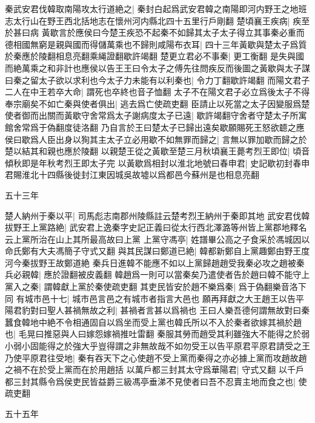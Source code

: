 秦武安君伐韓取南陽攻太行道絶之|{
	秦封白起爲武安君韓之南陽即河内野王之地班志太行山在野王西北括地志在懷州河内縣北四十五里行戶剛翻}
楚頃襄王疾病|{
	疾至於甚曰病}
黃歇言於應侯曰今楚王疾恐不起秦不如歸其太子太子得立其事秦必重而德相國無窮是親與國而得儲萬乘也不歸則咸陽布衣耳|{
	四十三年黃歇與楚太子爲質於秦應於陵翻相息亮翻乘䋲證翻歇許竭翻}
楚更立君必不事秦|{
	更工衡翻}
是失與國而絶萬乘之和非計也應侯以告王王曰令太子之傅先往問疾反而後圖之黃歇與太子謀曰秦之留太子欲以求利也今太子力未能有以利秦也|{
	令力丁翻歇許竭翻}
而陽文君子二人在中王若卒大命|{
	謂死也卒終也音子恤翻}
太子不在陽文君子必立爲後太子不得奉宗廟矣不如亡秦與使者俱出|{
	逃去爲亡使疏吏翻}
臣請止以死當之太子因變服爲楚使者御而出關而黃歇守舍常爲太子謝病度太子已遠|{
	歇許竭翻守舍者守楚太子所寓館舍常爲于偽翻度徒洛翻}
乃自言於王曰楚太子已歸出遠矣歇願賜死王怒欲聼之應侯曰歇爲人臣出身以狥其主太子立必用歇不如無罪而歸之|{
	言無以罪加歇而歸之於楚以結其和親也應於陵翻}
以親楚王從之黃歇至楚三月秋頃襄王薨考烈王即位|{
	頃音傾秋即是年秋考烈王即太子完}
以黃歇爲相封以淮北地號曰春申君|{
	史記歇初封春申君賜淮北十四縣後徙封江東因城吳故墟以爲都邑今蘇州是也相息亮翻}


五十三年

楚人納州于秦以平|{
	司馬彪志南郡州陵縣註云楚考烈王納州于秦即其地}
武安君伐韓拔野王上黨路絶|{
	武安君上逸秦字史記正義曰從太行西北澤潞等州皆上黨郡地釋名云上黨所治在山上其所最高故曰上黨}
上黨守馮亭|{
	姓譜畢公高之子食采於馮城因以命氏鄭有大夫馮簡子守式又翻}
與其民謀曰鄭道已絶|{
	韓都新鄭自上黨趣鄭由野王度河今秦拔野王故鄭道絶}
秦兵日進韓不能應不如以上黨歸趙趙受我秦必攻之趙被秦兵必親韓|{
	應於證翻被皮義翻}
韓趙爲一則可以當秦矣乃遣使者告於趙曰韓不能守上黨入之秦|{
	謂韓獻上黨於秦使疏吏翻}
其吏民皆安於趙不樂爲秦|{
	爲于偽翻樂音洛下同}
有城市邑十七|{
	城市邑言邑之有城市者指言大邑也}
願再拜獻之大王趙王以告平陽君豹對曰聖人甚禍無故之利|{
	甚禍者言甚以爲禍也}
王曰人樂吾德何謂無故對曰秦蠶食韓地中絶不令相通固自以爲坐而受上黨也韓氏所以不入於秦者欲嫁其禍於趙也|{
	毛晃曰推惡與人曰嫁怨嫁禍推吐雷翻}
秦服其勞而趙受其利雖強大不能得之於弱小弱小固能得之於強大乎豈得謂之非無故哉不如勿受王以告平原君平原君請受之王乃使平原君往受地|{
	秦有吞天下之心使趙不受上黨而秦得之亦必據上黨而攻趙故趙之禍不在於受上黨而在於用趙括}
以萬戶都三封其太守爲華陽君|{
	守式又翻}
以千戶都三封其縣令爲侯吏民皆益爵三級馮亭垂涕不見使者曰吾不忍賣主地而食之也|{
	使疏吏翻}


五十五年

